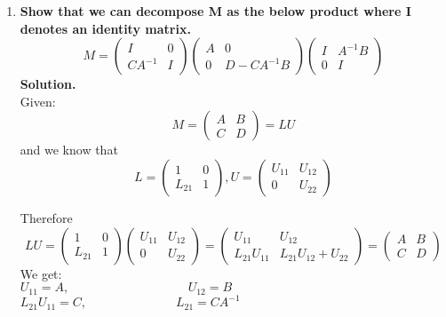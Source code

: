 \documentclass[12pt, oneside]{article}   	%
\begin{document}
\begin{enumerate}
\begin{enumerate}
	\item \textbf{Show that we can decompose M as the below product where I  denotes an identity matrix.
	$$
	M = \left(\begin{array}{cc} I & 0\\ CA^{-1} & I \end{array}\right)
	\left(\begin{array}{cc} A & 0\\ 0& D-CA^{-1}B \end{array}\right)
	\left(\begin{array}{cc} I & A^{-1}B \\0& I \end{array}\right)
	$$}
\textbf{Solution.}\\

Given:   
$$
M= \begin{pmatrix}
A& B\\
C & D
\end{pmatrix} = LU
$$ and we know that 
$$
L= \left(\begin{array}{cc} 1 & 0\\ L_{21} & 1 \end{array}\right) , U=
\left(\begin{array}{cc} U_{11} & U_{12}\\ 0& U_{22} \end{array}\right)
$$ 

Therefore
$$
LU= \left(\begin{array}{cc} 1 & 0\\ L_{21} & 1 \end{array}\right) \left(\begin{array}{cc} U_{11} & U_{12}\\ 0& U_{22} \end{array}\right)= \begin{pmatrix}
U_{11}&  U_{12}\\
L_{21}U_{11} & L_{21}U_{12}+U_{22} 
\end{pmatrix} 
=\begin{pmatrix}
A& B\\
C & D
\end{pmatrix} 
$$ 
We get:\\

\hspace{3cm}$U_{11}=A,\hspace{4cm}
U_{12}=B$\\

\hspace{3cm}$L_{21}U_{11}=C,\hspace{3cm}L_{21}= CA^{-1}$\\


\end{enumerate}
\end{enumerate}
\end{document}
